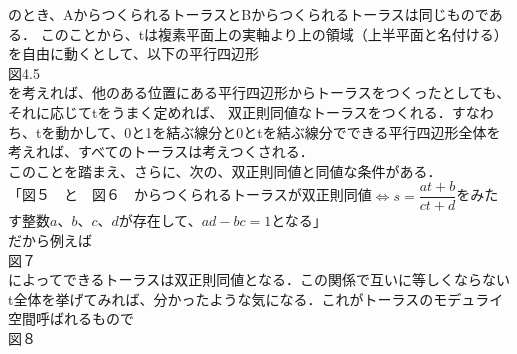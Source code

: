 \begin{figure}[h]
\begin{minipage}{0.5\hsize}
\end{minipage}
\begin{minipage}{0.5\hsize}
\end{minipage}
\end{figure}


のとき、AからつくられるトーラスとBからつくられるトーラスは同じものである．
このことから、tは複素平面上の実軸より上の領域（上半平面と名付ける）を自由に動くとして、以下の平行四辺形\\

図4.5\\

を考えれば、他のある位置にある平行四辺形からトーラスをつくったとしても、それに応じてtをうまく定めれば、 双正則同値なトーラスをつくれる．すなわち、tを動かして、0と1を結ぶ線分と0とtを結ぶ線分でできる平行四辺形全体を考えれば、すべてのトーラスは考えつくされる．\\
このことを踏まえ、さらに、次の、双正則同値と同値な条件がある．\\
「図５　と　図６　からつくられるトーラスが双正則同値$\Leftrightarrow $$s=\dfrac {at+b} {ct+d}$をみたす整数$a$、$b$、$c$、$d$が存在して、$ad-bc=1$となる」\\
だから例えば\\

図７\\

によってできるトーラスは双正則同値となる．この関係で互いに等しくならないt全体を挙げてみれば、分かったような気になる．これがトーラスのモデュライ空間呼ばれるもので\\

図８\\

